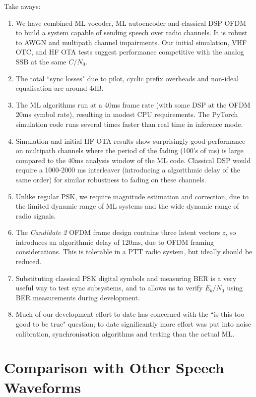 \documentclass{article}
\begin{document}
Take aways:
\begin{enumerate}
\item We have combined ML vocoder, ML autoencoder and classical DSP OFDM to build a system capable of sending speech over radio channels.  It is robust to AWGN and multipath channel impairments.  Our initial simulation, VHF OTC, and HF OTA tests suggest performance competitive with the analog SSB at the same $C/N_0$.
\item The total ``sync losses" due to pilot, cyclic prefix overheads and non-ideal equalisation are around 4dB. 
\item The ML algorithms run at a 40ms frame rate (with some DSP at the OFDM 20ms symbol rate), resulting in modest CPU requirements.  The PyTorch simulation code runs several times faster than real time in inference mode.
\item Simulation and initial HF OTA results show surprisingly good performance on multipath channels where the period of the fading (100's of ms) is large compared to the 40ms analysis window of the ML code.  Classical DSP would require a 1000-2000 ms interleaver (introducing a algorithmic delay of the same order) for similar robustness to fading on these channels.
\item Unlike regular PSK, we require magnitude estimation and correction, due to the limited dynamic range of ML systems and the wide dynamic range of radio signals.
\item The \emph{Candidate 2} OFDM frame design \cite{FreeDV-032} contains three latent vectors $z$, so introduces an algorithmic delay of 120ms, due to OFDM framing considerations.  This is tolerable in a PTT radio system, but ideally should be reduced.
\item Substituting classical PSK digital symbols and measuring BER is a very useful way to test sync subsystems, and to allows us to verify $E_b/N_0$ using BER measurements during development.
\item Much of our development effort to date has concerned with the ``is this too good to be true" question; to date significantly more effort was put into noise calibration, synchronisation algorithms and testing than the actual ML.
\end{enumerate}

\section{Comparison with Other Speech Waveforms}
\end{document}
